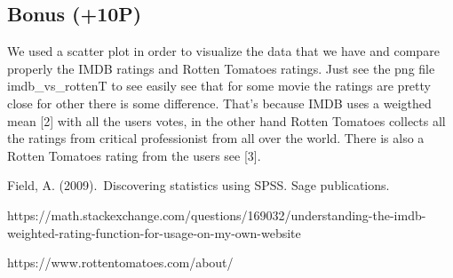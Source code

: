 \documentclass[a4paper]{article}
\begin{document}
	\subsection{}
	
	\subsection{Bonus (+10P)}
	
	We used a scatter plot in order to visualize the data that we have and compare properly the IMDB ratings and Rotten Tomatoes ratings.
	Just see the png file imdb\_vs\_rottenT to see easily see that for some movie the ratings are pretty close for other there is some difference.
	That's because IMDB uses a weigthed mean [2] with all the users votes, in the other hand Rotten Tomatoes collects all the ratings from critical professionist from all over the world. There is also a Rotten Tomatoes rating from the users see [3].


\newpage
\begin{thebibliography}{9}
	Field, A. (2009). Discovering statistics using SPSS. Sage publications. 
	
	https://math.stackexchange.com/questions/169032/understanding-the-imdb-weighted-rating-function-for-usage-on-my-own-website
	
	https://www.rottentomatoes.com/about/
\end{thebibliography}
\end{document}
